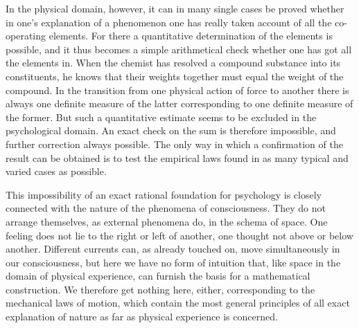 \documentclass[12pt,a4paper]{book}
\newcommand{\opage}[1]{\marginnote{\footnotesize\textit{[#1]}}}
\begin{document}
In the physical domain, however, it can in many single cases be proved
whether in one's explanation of a phenomenon one has really taken
account of all the co-operating elements. For there a quantitative
determination of the elements is possible, and it thus becomes a simple
arithmetical check whether one has got all the elements in. When the
chemist has resolved a compound substance into its constituents, he
knows that their weights together must equal the weight of the compound.
In the transition from one physical action of force to another there is
always one definite measure of the latter corresponding to one definite
measure of
\opage{25}the former. But such a quantitative estimate seems to be
excluded in the psychological domain. An exact check on the sum is
therefore impossible, and further correction always possible. The only
way in which a confirmation of the result can be obtained is to test the
empirical laws found in as many typical and varied cases as possible.

This impossibility of an exact rational foundation for psychology is
closely connected with the nature of the phenomena of consciousness. They
do not arrange themselves, as external phenomena do, in the schema of
space. One feeling does not lie to the right or left of another, one
thought not above or below another. Different currents can, as already
touched on, move simultaneously in our consciousness, but here we have no
form of intuition that, like space in the domain of physical experience,
can furnish the basis for a mathematical construction. We therefore get
nothing here, either, corresponding to the mechanical laws of motion,
which contain the most general principles of all exact explanation of
nature as far as physical experience is concerned.
\end{document}
